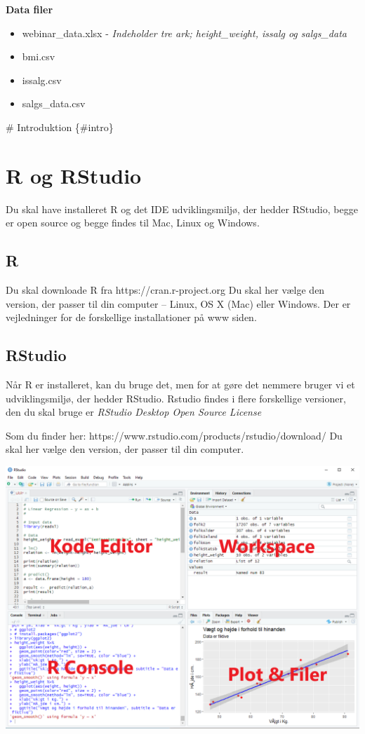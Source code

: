 \documentclass[
]{book}
\providecommand{\tightlist}{%
  \setlength{\itemsep}{0pt}\setlength{\parskip}{0pt}}
\begin{document}
\textbf{Data filer}

\begin{itemize}
\tightlist
\item
  webinar\_data.xlsx - \emph{Indeholder tre ark; height\_weight, issalg og salgs\_data}
\item
  bmi.csv
\item
  issalg.csv
\item
  salgs\_data.csv
\end{itemize}

﻿\# Introduktion \{\#intro\}

\hypertarget{R_RStudio}{%
\chapter{R og RStudio}\label{R_RStudio}}

Du skal have installeret R og det IDE udviklingsmiljø, der hedder RStudio, begge er open source og begge findes til Mac, Linux og Windows.

\hypertarget{r}{%
\section{R}\label{r}}

Du skal downloade R fra
https://cran.r-project.org
Du skal her vælge den version, der passer til din computer -- Linux, OS X (Mac) eller Windows.
Der er vejledninger for de forskellige installationer på www siden.

\hypertarget{rstudio}{%
\section{RStudio}\label{rstudio}}

Når R er installeret, kan du bruge det, men for at gøre det nemmere bruger vi et udviklingsmiljø, der hedder RStudio. Rstudio findes i flere forskellige versioner, den du skal bruge er \emph{RStudio Desktop Open Source License}

Som du finder her: https://www.rstudio.com/products/rstudio/download/
Du skal her vælge den version, der passer til din computer.

\includegraphics{img/rstudio_editor.png}
\end{document}
